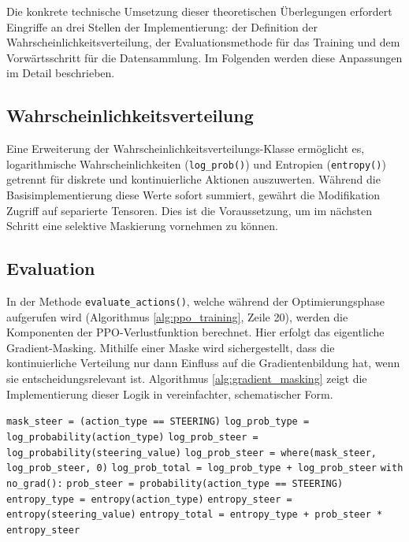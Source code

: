 Die konkrete technische Umsetzung dieser theoretischen Überlegungen erfordert Eingriffe an drei Stellen der Implementierung: der Definition der Wahrscheinlichkeitsverteilung, der Evaluationsmethode für das Training und dem Vorwärtsschritt für die Datensammlung. Im Folgenden werden diese Anpassungen im Detail beschrieben.

\subsection*{Wahrscheinlichkeitsverteilung}
Eine Erweiterung der Wahrscheinlichkeitsverteilungs\hyp{}Klasse ermöglicht es, logarithmische Wahrscheinlichkeiten (\texttt{log\_prob()}) und Entropien (\texttt{entropy()}) getrennt für diskrete und kontinuierliche Aktionen auszuwerten. Während die Basisimplementierung diese Werte sofort summiert, gewährt die Modifikation Zugriff auf separierte Tensoren. Dies ist die Voraussetzung, um im nächsten Schritt eine selektive Maskierung vornehmen zu können.

\subsection*{Evaluation}
In der Methode \texttt{evaluate\_actions()}, welche während der Optimierungsphase aufgerufen wird (Algorithmus \ref{alg:ppo_training}, Zeile 20), werden die Komponenten der \ac{PPO}\hyp{}Verlustfunktion berechnet. Hier erfolgt das eigentliche Gradient\hyp{}Masking.
Mithilfe einer Maske wird sichergestellt, dass die kontinuierliche Verteilung nur dann Einfluss auf die Gradientenbildung hat, wenn sie entscheidungsrelevant ist.
Algorithmus \ref{alg:gradient_masking} zeigt die Implementierung dieser Logik in vereinfachter, schematischer Form.

\begin{algorithm}
\caption{Gradient-Masking in der Evaluationsfunktion (vereinfacht)}
\label{alg:gradient_masking}
\begin{algorithmic}[1]
\State \texttt{mask\_steer = (action\_type == STEERING)}
\Statex
\State \texttt{log\_prob\_type = log\_probability(action\_type)}
\State \texttt{log\_prob\_steer = log\_probability(steering\_value)}
\Statex
\State \texttt{log\_prob\_steer = where(mask\_steer, log\_prob\_steer, 0)}
\State \texttt{log\_prob\_total = log\_prob\_type + log\_prob\_steer}
\Statex
\State \texttt{with no\_grad():}
\State \quad \texttt{prob\_steer = probability(action\_type == STEERING)}
\Statex
\State \texttt{entropy\_type = entropy(action\_type)}
\State \texttt{entropy\_steer = entropy(steering\_value)}
\Statex
\State \texttt{entropy\_total = entropy\_type + prob\_steer * entropy\_steer}
\end{algorithmic}
\end{algorithm}
\medskip
 
